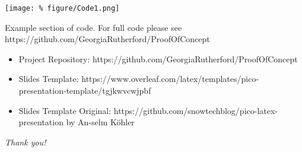 \documentclass[unknownkeysallowed,usepdftitle=false, parskip=full]{beamer}
\newcommand{\secvariable}{nothing}
\newcommand{\mysection}[1]{\renewcommand{\secvariable}{#1}
}
\begin{document}
\mysection{minor}
\begin{frame}\label{\secvariable} %
\begin{center}
\texttt{[image: \%
figure/Code1.png]}
\end{center}
\vspace{-0.2cm}

Example section of code. For full code please see https://github.com/GeorgiaRutherford/ProofOfConcept

\end{frame}

\mysection{conclusion}
\begin{frame}\label{\secvariable}
  
  \begin{itemize}
   \item Project Repository: https://github.com/GeorgiaRutherford/ProofOfConcept 
  \item Slides Template: https://www.overleaf.com/latex/templates/pico-presentation-template/tgjkwvcwjpbf
  \item Slides Template Original: https://github.com/snowtechblog/pico-latex-presentation by An-selm Köhler

  \end{itemize}

 
\textit{Thank you!} 
  
\end{frame}
\end{document}

